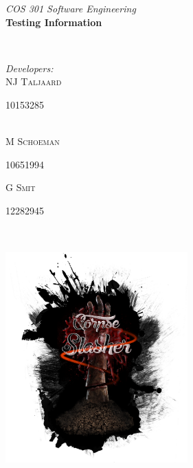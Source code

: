 \documentclass[letterpaper]{article}
\makeatletter
\def\printauthor{%
    {\large \@author}}
\makeatother
\begin{document}
\begin{titlepage}
\begin{center}
\begin{minipage}{0.4\textwidth}
\begin{flushleft} \large
\emph{COS 301 Software Engineering}\\
\vspace{1cm} \textbf{Testing Information}
\end{flushleft}
\end{minipage}
~
\begin{minipage}{0.4\textwidth}
	\begin{flushright} \large
	\emph{Developers:} \\
		NJ \textsc{Taljaard} \\
			\begin{small}
				10153285
			\end{small} \\
		M  \textsc{Schoeman} \\
			\begin{small}
				10651994 \\
			\end{small}
		G  \textsc{Smit} \\
			\begin{small}
				12282945
			\end{small}
	\end{flushright}
\end{minipage}\\



\includegraphics[width=70mm, height=90mm]{corpseslasher.png}\\ %
 

\end{center}
\end{titlepage}
\end{document}
